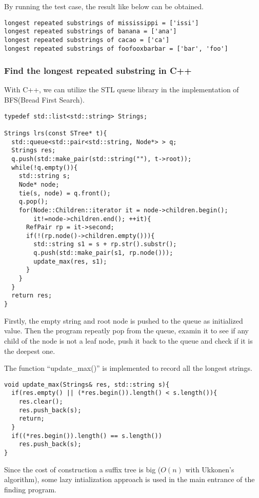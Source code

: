 \documentclass{article}
\begin{document}
By running the test case, the result like below can be obtained.

\begin{verbatim}
longest repeated substrings of mississippi = ['issi']
longest repeated substrings of banana = ['ana']
longest repeated substrings of cacao = ['ca']
longest repeated substrings of foofooxbarbar = ['bar', 'foo']
\end{verbatim}

\subsubsection*{Find the longest repeated substring in C++}
With C++, we can utilize the STL queue library in the implementation
of BFS(Bread First Search). 

\lstset{language=C++}
\begin{lstlisting}
typedef std::list<std::string> Strings;

Strings lrs(const STree* t){
  std::queue<std::pair<std::string, Node*> > q;
  Strings res;
  q.push(std::make_pair(std::string(""), t->root));
  while(!q.empty()){
    std::string s;
    Node* node;
    tie(s, node) = q.front();
    q.pop();
    for(Node::Children::iterator it = node->children.begin();
        it!=node->children.end(); ++it){
      RefPair rp = it->second;
      if(!(rp.node()->children.empty())){
        std::string s1 = s + rp.str().substr();
        q.push(std::make_pair(s1, rp.node()));
        update_max(res, s1);
      }
    }
  }
  return res;
} 
\end{lstlisting}

Firstly, the empty string and root node is pushed to the queue
as initialized value. Then the program repeatly pop from the queue,
examin it to see if any child of the node is not a leaf node,
push it back to the queue and check if it is the deepest one.

The function ``update\_max()'' is implemented to record all the
longest strings.

\begin{lstlisting}
void update_max(Strings& res, std::string s){
  if(res.empty() || (*res.begin()).length() < s.length()){
    res.clear();
    res.push_back(s);
    return;
  }
  if((*res.begin()).length() == s.length())
    res.push_back(s);
}
\end{lstlisting}

Since the cost of construction a suffix tree is big ($O(n)$ with
Ukkonen's algorithm), some lazy intialization approach is used in
the main entrance of the finding program.
\end{document}
